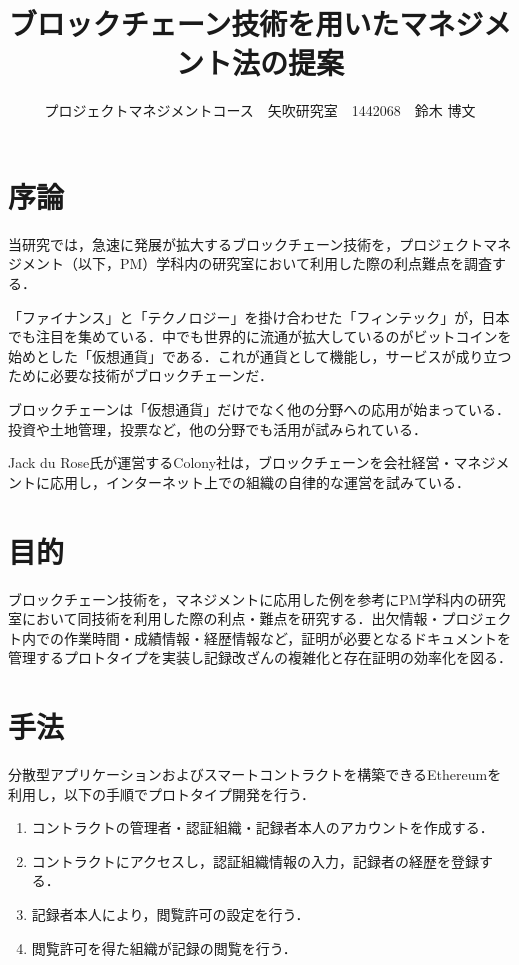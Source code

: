 \documentclass[uplatex,twocolumn,dvipdfmx]{jsarticle}
\title{\vspace{-5mm}\fontsize{14pt}{0pt}\selectfont ブロックチェーン技術を用いたマネジメント法の提案}
\author{\normalsize プロジェクトマネジメントコース　矢吹研究室　1442068　鈴木 博文}
\date{}
\begin{document}
\fontsize{10.5pt}{\baselineskip}\selectfont
\maketitle





\section{序論}\label{序論}

当研究では，急速に発展が拡大するブロックチェーン技術を，プロジェクトマネジメント（以下，PM）学科内の研究室において利用した際の利点難点を調査する．

「ファイナンス」と「テクノロジー」を掛け合わせた「フィンテック」が，日本でも注目を集めている\cite{fujitsu}．中でも世界的に流通が拡大しているのがビットコインを始めとした「仮想通貨」である．これが通貨として機能し，サービスが成り立つために必要な技術がブロックチェーンだ．

ブロックチェーンは「仮想通貨」だけでなく他の分野への応用が始まっている．投資や土地管理，投票など，他の分野でも活用が試みられている．

Jack du Rose氏が運営するColony社は，ブロックチェーンを会社経営・マネジメントに応用し，インターネット上での組織の自律的な運営を試みている\cite{wired}．

\section{目的}

ブロックチェーン技術を，マネジメントに応用した例を参考にPM学科内の研究室において同技術を利用した際の利点・難点を研究する．出欠情報・プロジェクト内での作業時間・成績情報・経歴情報など，証明が必要となるドキュメントを管理するプロトタイプを実装し記録改ざんの複雑化と存在証明の効率化を図る．

\section{手法}

分散型アプリケーションおよびスマートコントラクトを構築できるEthereumを利用し，以下の手順でプロトタイプ開発を行う．

\begin{enumerate}
\item コントラクトの管理者・認証組織・記録者本人のアカウントを作成する．
\item コントラクトにアクセスし，認証組織情報の入力，記録者の経歴を登録する．
\item 記録者本人により，閲覧許可の設定を行う．
\item 閲覧許可を得た組織が記録の閲覧を行う．
\end{enumerate}
\end{document}
